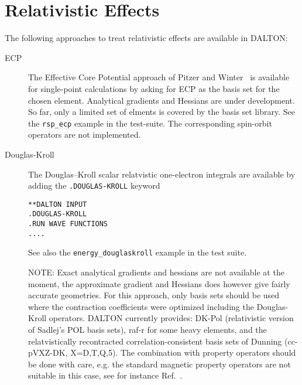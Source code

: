 \chapter{\label{chap:Relativity}Relativistic Effects}

The following approaches to treat relativistic effects are available in DALTON:

\begin{description}

\item[ECP] The Effective Core Potential approach of Pitzer and Winter~\cite{rmpnmwijqc40} is available 
for single-point calculations by asking for ECP as the basis set for the chosen element. Analytical gradients and Hessians are under development. So far, only a limited 
set of elments is covered by the basis set library. See the \verb|rsp_ecp| example in the 
test-suite. The corresponding spin-orbit operators are not implemented.  	

\begin{center}
\end{center}


\item[Douglas-Kroll] The Douglas--Kroll scalar relatvistic one-electron integrals  
are available by adding the \verb|.DOUGLAS-KROLL|   keyword
\begin{verbatim}
**DALTON INPUT
.DOUGLAS-KROLL
.RUN WAVE FUNCTIONS
....
\end{verbatim}

See also the \verb|energy_douglaskroll| example in the test suite.

  NOTE: Exact analytical gradients and hessians are not available 
at the moment, the approximate gradient and Hessians does however give fairly accurate geometries.  For this approach, only basis sets should be used 
where the contraction coefficients were optimized including the Douglas-Kroll 
operators. DALTON currently provides:  DK-Pol (relativistic version of Sadlej's POL basis sets), raf-r for some heavy elements, and the relatvistically recontracted correlation-consistent basis sets of Dunning (cc-pVXZ-DK, X=D,T,Q,5). The combination with 
property operators should be done with care, e.g. the standard magnetic property
operators are not suitable in this case, see for instance Ref.~\cite{}.


\end{description}

